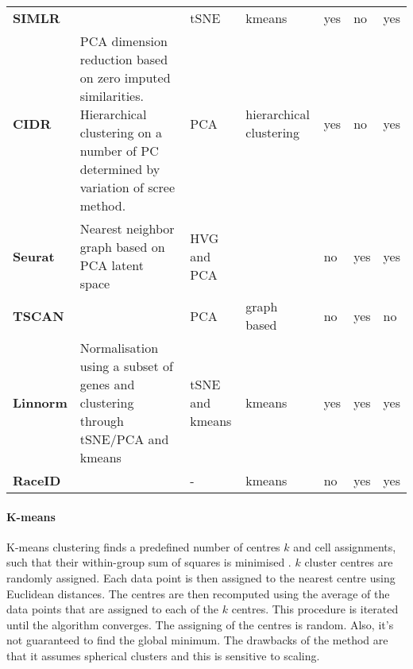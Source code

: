 \documentclass[11pt, a4paper]{article}\usepackage[]{graphicx}\usepackage[]{color}
\begin{document}
\begin{table}[htbp]
{\begin{tabular}{p{5.9em}lp{8em}p{5.5em}p{3em}p{3em}p{3em}}
    \textbf{SIMLR} &       & tSNE  & kmeans & yes   & no    & yes \\
    \textbf{CIDR} & \multicolumn{1}{p{13.085em}}{PCA dimension reduction based on zero imputed similarities.  Hierarchical clustering on a number of PC determined by variation of scree method.} & PCA   & hierarchical clustering & yes   & no    & yes \\
    \textbf{Seurat} & \multicolumn{1}{p{13.085em}}{Nearest neighbor graph based on PCA latent space} & HVG and PCA & \multicolumn{1}{l}{} & no    & yes   & yes \\
    \midrule
    \textbf{TSCAN} &       & PCA   & graph based & no    & yes   & no \\
    \midrule
    \textbf{Linnorm} & \multicolumn{1}{p{13.085em}}{Normalisation using a subset of genes and clustering through tSNE/PCA and kmeans} & tSNE and kmeans & kmeans & yes   & yes   & yes \\
    \midrule
    \textbf{RaceID} &       & -     & kmeans & no    & yes   & yes \\
    \bottomrule
    \end{tabular}}%
  \label{tab:addlabel}%
\end{table}%


\paragraph{K-means}
K-means clustering finds a predefined number of centres $k$ and cell assignments, such that their within-group sum of squares is minimised \citep{hartigan1979algorithm}. $k$ cluster centres are randomly assigned.
Each data point is then assigned to the nearest centre using Euclidean distances. The centres are then recomputed using the average of the data points that are assigned to each of the $k$ centres. This procedure is iterated until the algorithm converges. The assigning of the centres is random. Also, it's not guaranteed to find the global minimum.  The drawbacks of the method are that it assumes spherical clusters and this is sensitive to scaling. 
\end{document}
